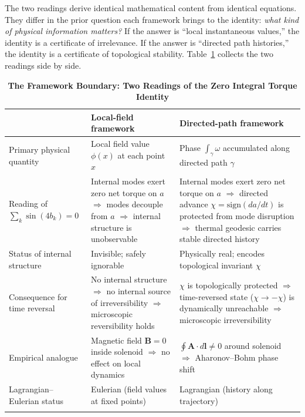 \documentclass[%
 reprint, amsmath,amssymb, aps, prb, ]{revtex4-2}
\numberwithin{equation}{section}
\begin{document}
The two readings derive identical mathematical content from identical equations. They differ in the prior question each framework brings to the identity: \emph{what kind of physical information matters?} If the answer is ``local instantaneous values,'' the identity is a certificate of irrelevance. If the answer is ``directed path histories,'' the identity is a certificate of topological stability. Table~\ref{tab:framework_boundary} collects the two readings side by side.

\begin{table}[t!]
\centering
\caption{\textbf{The Framework Boundary: Two Readings of the Zero Integral Torque Identity}}
\label{tab:framework_boundary}
\renewcommand{\arraystretch}{1.4}
\begin{tabular}{p{3.5cm}p{5.5cm}p{6.5cm}}
\toprule
& \textbf{Local-field framework} & \textbf{Directed-path framework} \\
\midrule
Primary physical quantity
& Local field value $\phi(x)$ at each point $x$
& Phase $\int_\gamma\omega$ accumulated along directed path $\gamma$ \\
\addlinespace[0.3cm]
Reading of $\sum_k\sin(4b_k)=0$
& Internal modes exert zero net torque on $a$ $\Rightarrow$ modes decouple from $a$ $\Rightarrow$ internal structure is unobservable
& Internal modes exert zero net torque on $a$ $\Rightarrow$ directed advance $\chi=\mathrm{sign}(da/dt)$ is protected from mode disruption $\Rightarrow$ thermal geodesic carries stable directed history \\
\addlinespace[0.3cm]
Status of internal structure
& Invisible; safely ignorable
& Physically real; encodes topological invariant $\chi$ \\
\addlinespace[0.3cm]
Consequence for time reversal
& No internal structure $\Rightarrow$ no internal source of irreversibility $\Rightarrow$ microscopic reversibility holds
& $\chi$ is topologically protected $\Rightarrow$ time-reversed state ($\chi\to-\chi$) is dynamically unreachable $\Rightarrow$ microscopic irreversibility \\
\addlinespace[0.3cm]
Empirical analogue
& Magnetic field $\mathbf{B}=0$ inside solenoid $\Rightarrow$ no effect on local dynamics
& $\oint\mathbf{A}\cdot d\mathbf{l}\neq 0$ around solenoid $\Rightarrow$ Aharonov--Bohm phase shift \\
\addlinespace[0.3cm]
Lagrangian--Eulerian status
& Eulerian (field values at fixed points)
& Lagrangian (history along trajectory) \\
\addlinespace[0.2cm]
\bottomrule

\end{tabular}
\end{table}
\end{document}
